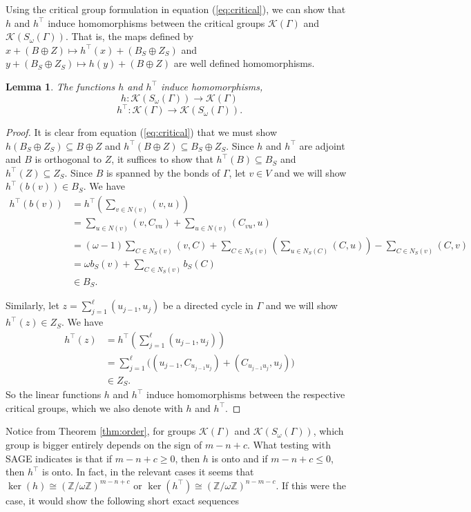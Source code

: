\documentclass[12pt]{report}
\newtheorem{lem}[thm]{Lemma}
\theoremstyle{definition}
\def\ZZ{{\mathbb Z}}
\begin{document}
Using the critical group formulation in equation (\ref{eq:critical}), we can show that $h$ and $h^\top$ induce homomorphisms between the critical groups $\mathcal{K}(\Gamma)$ and $\mathcal{K}(S_\omega(\Gamma))$. That is, the maps defined by $x+(B\oplus Z) \mapsto h^\top(x)+(B_S\oplus Z_S)$ and $y+(B_S\oplus Z_S) \mapsto h(y)+(B\oplus Z)$ are well defined homomorphisms.
\begin{lem}
    The functions $h$ and $h^\top$ induce homomorphisms,
    \[h:\mathcal{K}(S_\omega(\Gamma))\rightarrow \mathcal{K}(\Gamma)\]
    \[h^\top:\mathcal{K}(\Gamma)\rightarrow \mathcal{K}(S_\omega(\Gamma)).\]
\end{lem}
\begin{proof}
    It is clear from equation (\ref{eq:critical}) that we must show $h(B_S \oplus Z_S) \subseteq B\oplus Z$ and $h^\top(B \oplus Z) \subseteq B_S\oplus Z_S$. Since $h$ and $h^\top$ are adjoint and $B$ is orthogonal to $Z$, it suffices to show that $h^\top(B)\subseteq B_S$ and $h^\top(Z) \subseteq Z_S$. Since $B$ is spanned by the bonds of $\Gamma$, let $v\in V$ and we will show $h^\top(b(v)) \in B_S$. We have
    \begin{align*}
        h^\top(b(v)) &= h^\top\left(\sum_{v \in N(v)}(v,u) \right) \\
        &= \sum_{u \in N(v)}(v,C_{vu})+\sum_{u \in N(v)}(C_{vu},u) \\
        &= (\omega-1)\sum_{C \in N_S(v)}(v,C)+\sum_{C \in N_S(v)}\left(\sum_{u \in N_S(C)}(C,u) \right)-\sum_{C \in N_S(v)}(C,v) \\
        &= \omega b_S(v)+\sum_{C \in N_S(v)}b_S(C) \\
        &\in B_S.
    \end{align*}

    Similarly, let $z=\sum_{j=1}^\ell(u_{j-1}, u_j)$ be a directed cycle in $\Gamma$ and we will show $h^\top(z)\in Z_S$. We have 
    \begin{align*}
        h^\top(z) &= h^\top \left(\sum_{j=1}^\ell(u_{j-1}, u_j) \right) \\
        &= \sum_{j=1}^\ell\Big((u_{j-1}, C_{u_{j-1}u_{j}})+(C_{u_{j-1}u_{j}}, u_j) \Big) \\
        &\in Z_S.
    \end{align*}
    So the linear functions $h$ and $h^\top$ induce homomorphisms between the respective critical groups, which we also denote with $h$ and $h^\top$.
\end{proof}
Notice from Theorem \ref{thm:order}, for groups $\mathcal{K}(\Gamma)$ and $\mathcal{K}(S_\omega(\Gamma))$, which group is bigger entirely depends on the sign of $m-n+c$. What testing with SAGE indicates is that if $m-n+c \geq 0$, then $h$ is onto and if $m-n+c\leq 0$, then $h^\top$ is onto. In fact, in the relevant cases it seems that $\ker(h) \cong (\ZZ/\omega\ZZ)^{m-n+c}$ or $\ker(h^\top)\cong (\ZZ/\omega\ZZ)^{n-m-c}$. If this were the case, it would show the following short exact sequences
\end{document}
